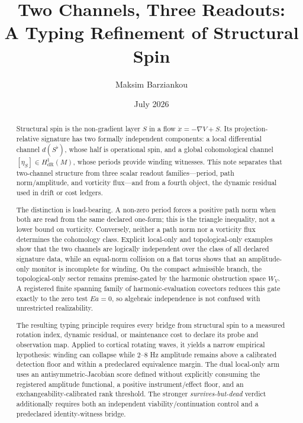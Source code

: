 \documentclass[11pt]{article}
\title{Two Channels, Three Readouts:\\
A Typing Refinement of Structural Spin}
\author{Maksim Barziankou}
\date{July 2026}
\theoremstyle{definition}
\newcommand{\dR}{\mathrm{dR}}
\begin{document}
\maketitle

\begin{abstract}
Structural spin is the non-gradient layer \(S\) in a flow
\(\dot x=-\nabla V+S\).  Its projection-relative signature has two formally
independent components: a local differential channel \(d(S^\flat)\), whose
half is operational spin, and a global cohomological channel
\([\eta_S]\in H^1_{\dR}(M)\), whose periods provide winding witnesses.
This note separates that two-channel structure from three scalar readout
families---period, path norm/amplitude, and vorticity flux---and from a
fourth object, the dynamic residual used in drift or cost ledgers.

The distinction is load-bearing.  A non-zero period forces a positive
path norm when both are read from the same declared one-form; this is
the triangle inequality, not a lower bound on vorticity.  Conversely,
neither a path norm nor a vorticity flux determines the cohomology class.
Explicit local-only and topological-only examples show that the two
channels are logically independent over the class of all declared signature
data, while an equal-norm collision on a flat torus shows that an
amplitude-only monitor is incomplete for winding.  On the compact
admissible branch, the topological-only sector remains premise-gated by
the harmonic obstruction space \(W_V\).  A registered finite spanning
family of harmonic-evaluation covectors reduces this gate exactly to the
zero test \(Ea=0\), so algebraic independence is not confused with
unrestricted realizability.

The resulting typing principle requires every bridge from structural
spin to a measured rotation index, dynamic residual, or maintenance cost
to declare its probe and observation map.  Applied to cortical rotating
waves, it yields a narrow empirical hypothesis: winding can collapse
while \(2\text{--}8\) Hz amplitude remains above a calibrated detection
floor and within a predeclared equivalence margin.  The dual local-only arm uses an antisymmetric-Jacobian score defined
without explicitly consuming the registered amplitude functional, a positive
instrument/effect floor, and an exchangeability-calibrated rank threshold.
The stronger \emph{survives-but-dead} verdict additionally requires both an
independent viability/continuation control and a predeclared
identity-witness bridge.
\end{abstract}
\end{document}
